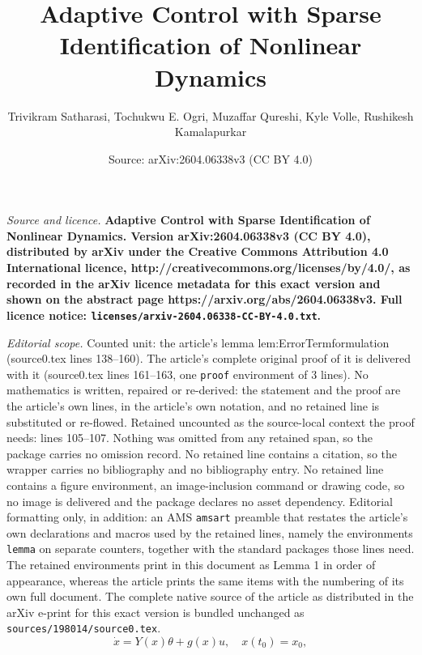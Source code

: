 \documentclass[10pt,a4paper]{amsart}
\title{\LARGE \bf Adaptive Control with Sparse Identification of Nonlinear Dynamics}
\author{Trivikram Satharasi, Tochukwu E. Ogri, Muzaffar Qureshi, Kyle Volle, Rushikesh Kamalapurkar}
\date{Source: arXiv:2604.06338v3 (CC BY 4.0)}
\begin{document}
\maketitle

\noindent\emph{Source and licence.} \LARGE \bf Adaptive Control with Sparse Identification of Nonlinear Dynamics. Version arXiv:2604.06338v3 (CC BY 4.0), distributed by arXiv under the Creative Commons Attribution 4.0 International licence, http://creativecommons.org/licenses/by/4.0/, as recorded in the arXiv licence metadata for this exact version and shown on the abstract page https://arxiv.org/abs/2604.06338v3. Full licence notice: \texttt{licenses/arxiv-2604.06338-CC-BY-4.0.txt}.\par\smallskip

\noindent\textit{Editorial scope.} Counted unit: the article's lemma lem:ErrorTermformulation (source0.tex lines 138--160). The article's complete original proof of it is delivered with it (source0.tex lines 161--163, one \texttt{proof} environment of 3 lines). No mathematics is written, repaired or re-derived: the statement and the proof are the article's own lines, in the article's own notation, and no retained line is substituted or re-flowed.  Retained uncounted as the source-local context the proof needs: lines 105--107.  Nothing was omitted from any retained span, so the package carries no omission record.  No retained line contains a citation, so the wrapper carries no bibliography and no bibliography entry.  No retained line contains a figure environment, an image-inclusion command or drawing code, so no image is delivered and the package declares no asset dependency.  Editorial formatting only, in addition: an AMS \texttt{amsart} preamble that restates the article's own declarations and macros used by the retained lines, namely the environments \texttt{lemma} on separate counters, together with the standard packages those lines need.  The retained environments print in this document as Lemma 1 in order of appearance, whereas the article prints the same items with the numbering of its own full document.  The complete native source of the article as distributed in the arXiv e-print for this exact version is bundled unchanged as \texttt{sources/198014/source0.tex}.
\begin{equation}\label{eq:dynamics}
    \dot{x} = Y(x)\theta + g(x)u, \quad x(t_{0}) = x_{0},
\end{equation}
\end{document}
